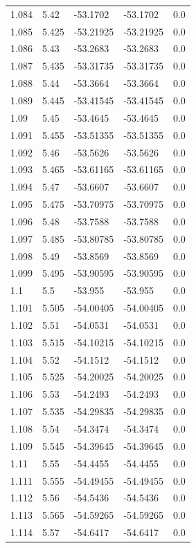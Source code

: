 \begin{tabular}{lllll}
1.084 & 5.42 & -53.1702 & -53.1702 & 0.0 \\
1.085 & 5.425 & -53.21925 & -53.21925 & 0.0 \\
1.086 & 5.43 & -53.2683 & -53.2683 & 0.0 \\
1.087 & 5.435 & -53.31735 & -53.31735 & 0.0 \\
1.088 & 5.44 & -53.3664 & -53.3664 & 0.0 \\
1.089 & 5.445 & -53.41545 & -53.41545 & 0.0 \\
1.09 & 5.45 & -53.4645 & -53.4645 & 0.0 \\
1.091 & 5.455 & -53.51355 & -53.51355 & 0.0 \\
1.092 & 5.46 & -53.5626 & -53.5626 & 0.0 \\
1.093 & 5.465 & -53.61165 & -53.61165 & 0.0 \\
1.094 & 5.47 & -53.6607 & -53.6607 & 0.0 \\
1.095 & 5.475 & -53.70975 & -53.70975 & 0.0 \\
1.096 & 5.48 & -53.7588 & -53.7588 & 0.0 \\
1.097 & 5.485 & -53.80785 & -53.80785 & 0.0 \\
1.098 & 5.49 & -53.8569 & -53.8569 & 0.0 \\
1.099 & 5.495 & -53.90595 & -53.90595 & 0.0 \\
1.1 & 5.5 & -53.955 & -53.955 & 0.0 \\
1.101 & 5.505 & -54.00405 & -54.00405 & 0.0 \\
1.102 & 5.51 & -54.0531 & -54.0531 & 0.0 \\
1.103 & 5.515 & -54.10215 & -54.10215 & 0.0 \\
1.104 & 5.52 & -54.1512 & -54.1512 & 0.0 \\
1.105 & 5.525 & -54.20025 & -54.20025 & 0.0 \\
1.106 & 5.53 & -54.2493 & -54.2493 & 0.0 \\
1.107 & 5.535 & -54.29835 & -54.29835 & 0.0 \\
1.108 & 5.54 & -54.3474 & -54.3474 & 0.0 \\
1.109 & 5.545 & -54.39645 & -54.39645 & 0.0 \\
1.11 & 5.55 & -54.4455 & -54.4455 & 0.0 \\
1.111 & 5.555 & -54.49455 & -54.49455 & 0.0 \\
1.112 & 5.56 & -54.5436 & -54.5436 & 0.0 \\
1.113 & 5.565 & -54.59265 & -54.59265 & 0.0 \\
1.114 & 5.57 & -54.6417 & -54.6417 & 0.0 \\

\end{tabular}
